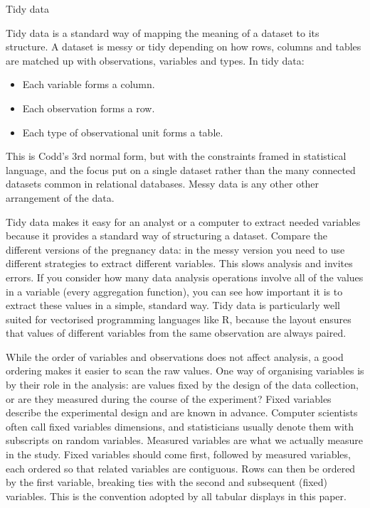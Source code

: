 Tidy data

Tidy data is a standard way of mapping the meaning of a dataset to its structure. A dataset is messy or tidy depending on how rows, columns and tables are matched up with observations, variables and types. In tidy data:

\begin{itemize}
\item Each variable forms a column.
\item Each observation forms a row.
\item Each type of observational unit forms a table.
\end{itemize}

This is Codd's 3rd normal form, but with the constraints framed in statistical language, and the focus put on a single dataset rather than the many connected datasets common in relational databases. Messy data is any other other arrangement of the data.

Tidy data makes it easy for an analyst or a computer to extract needed variables because it provides a standard way of structuring a dataset. Compare the different versions of the pregnancy data: in the messy version you need to use different strategies to extract different variables. This slows analysis and invites errors. If you consider how many data analysis operations involve all of the values in a variable (every aggregation function), you can see how important it is to extract these values in a simple, standard way. Tidy data is particularly well suited for vectorised programming languages like R, because the layout ensures that values of different variables from the same observation are always paired.

While the order of variables and observations does not affect analysis, a good ordering makes it easier to scan the raw values. One way of organising variables is by their role in the analysis: are values fixed by the design of the data collection, or are they measured during the course of the experiment? Fixed variables describe the experimental design and are known in advance. Computer scientists often call fixed variables dimensions, and statisticians usually denote them with subscripts on random variables. Measured variables are what we actually measure in the study. Fixed variables should come first, followed by measured variables, each ordered so that related variables are contiguous. Rows can then be ordered by the first variable, breaking ties with the second and subsequent (fixed) variables. This is the convention adopted by all tabular displays in this paper.


